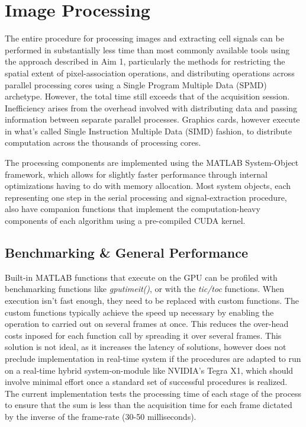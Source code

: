 \documentclass[../main.tex]{subfiles}
\begin{document}
\thispagestyle{myheadings}


\section{Image Processing}\label{image-processing}

The entire procedure for processing images and extracting cell signals can be performed in substantially less time than most commonly available tools using the approach described in Aim 1, particularly the methods for restricting the spatial extent of pixel-association operations, and distributing operations across parallel processing cores using a Single Program Multiple Data (SPMD) archetype.
However, the total time still exceeds that of the acquisition session.
Inefficiency arises from the overhead involved with distributing data and passing information between separate parallel processes.
Graphics cards, however execute in what's called Single Instruction Multiple Data (SIMD) fashion, to distribute computation across the thousands of processing cores.

The processing components are implemented using the MATLAB System-Object framework, which allows for slightly faster performance through internal optimizations having to do with memory allocation.
Most system objects, each representing one step in the serial processing and signal-extraction procedure, also have companion functions that implement the computation-heavy components of each algorithm using a pre-compiled CUDA kernel.

\subsection{
	Benchmarking \& General Performance}\label{benchmarking-general-performance}

Built-in MATLAB functions that execute on the GPU can be profiled with benchmarking functions like \emph{gputimeit()}, or with the \emph{tic/toc} functions.
When execution isn't fast enough, they need to be replaced with custom functions.
The custom functions typically achieve the speed up necessary by enabling the operation to carried out on several frames at once.
This reduces the over-head costs inposed for each function call by spreading it over several frames.
This solution is not ideal, as it increases the latency of solutions, however does not preclude implementation in real-time system if the procedures are adapted to run on a real-time hybrid system-on-module like NVIDIA's Tegra X1, which should involve minimal effort once a standard set of successful procedures is realized.
The current implementation tests the processing time of each stage of the process to ensure that the sum is less than the acquisition time for each frame dictated by the inverse of the frame-rate (30-50 milliseconds).
\end{document}
